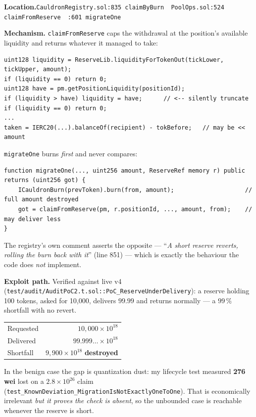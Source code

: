 \documentclass[10pt,a4paper]{article}
\newcommand{\loc}[1]{%
  \smallskip\noindent
  {\raggedright\textbf{Location.}\quad\texttt{\small #1}\par}\smallskip}
\newcommand{\code}[1]{\texttt{\small #1}}
\begin{document}
\loc{CauldronRegistry.sol:835 \texttt{claimByBurn} \textbullet\ PoolOps.sol:524 \texttt{claimFromReserve} \textbullet\ :601 \texttt{migrateOne}}

\textbf{Mechanism.} \code{claimFromReserve} caps the withdrawal at the
position's available liquidity and returns whatever it managed to take:

\begin{lstlisting}[firstnumber=533]
uint128 liquidity = ReserveLib.liquidityForTokenOut(tickLower, tickUpper, amount);
if (liquidity == 0) return 0;
uint128 have = pm.getPositionLiquidity(positionId);
if (liquidity > have) liquidity = have;      // <-- silently truncate
if (liquidity == 0) return 0;
...
taken = IERC20(...).balanceOf(recipient) - tokBefore;   // may be << amount
\end{lstlisting}

\noindent \code{migrateOne} burns \emph{first} and never compares:

\begin{lstlisting}[firstnumber=601]
function migrateOne(..., uint256 amount, ReserveRef memory r) public returns (uint256 got) {
    ICauldronBurn(prevToken).burn(from, amount);                    // full amount destroyed
    got = claimFromReserve(pm, r.positionId, ..., amount, from);    // may deliver less
}
\end{lstlisting}

\noindent The registry's own comment asserts the opposite --- ``\emph{A short
reserve reverts, rolling the burn back with it}'' (line 851) --- which is
exactly the behaviour the code does \emph{not} implement.

\textbf{Exploit path.} Verified against live v4
(\code{test/audit/AuditPoC2.t.sol::PoC\_ReserveUnderDelivery}): a reserve holding
100 tokens, asked for 10{,}000, delivers $99.99$ and returns normally ---
a $99\,\%$ shortfall with no revert.

\begin{center}\small
\begin{tabular}{@{}lr@{}}
\toprule
Requested & $10{,}000 \times 10^{18}$ \\
Delivered & $99.999\ldots \times 10^{18}$ \\
Shortfall & $9{,}900 \times 10^{18}$ \textbf{destroyed} \\
\bottomrule
\end{tabular}
\end{center}

\noindent In the benign case the gap is quantization dust: my lifecycle test
measured \textbf{276 wei} lost on a $2.8\times10^{26}$ claim
(\code{test\_KnownDeviation\_MigrationIsNotExactlyOneToOne}). That is
economically irrelevant \emph{but it proves the check is absent}, so the
unbounded case is reachable whenever the reserve is short.
\end{document}
